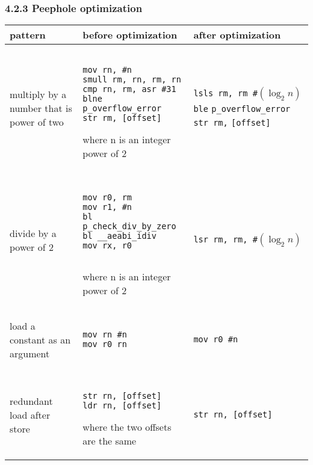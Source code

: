\documentclass[10pt,a4paper]{report}
\newenvironment{tabularverbatim}
 {\VerbatimEnvironment
  \begin{BVerbatim}[baseline=c,formatcom=\setlength{\baselineskip}{\normalbaselineskip}]}
 {\end{BVerbatim}}
\begin{document}
  \subsubsection*{4.2.3 Peephole optimization}
  \begin{center}
    \begin{tabular}{| m{3cm} | m{4cm} | m{4cm} |}
      \hline
      pattern & before optimization & after optimization \\
      \hline
      multiply by a number that is power of two &
      \begin{tabularverbatim}

mov rn, #n
smull rm, rn, rm, rn
cmp rn, rm, asr #31
blne p_overflow_error
str rm, [offset]

      \end{tabularverbatim}
      \newline
      where n is an integer power of 2
      &
      \texttt{lsls rm, rm \#$(\log_2 n)$}
      \newline
      \texttt{ble} \verb|p_overflow_error|
      \newline
      \texttt{str rm,} \verb|[offset]|
      \\
      \hline
      divide by a power of 2 &
      \begin{tabularverbatim}

mov r0, rm
mov r1, #n
bl p_check_div_by_zero
bl __aeabi_idiv
mov rx, r0
 
      \end{tabularverbatim}
      \newline
      where n is an integer power of 2
      &
      \texttt{lsr rm, rm, \#$(\log_2 n)$}
      \\
      \hline
      load a constant as an argument &
      \begin{tabularverbatim}

mov rn #n
mov r0 rn
 
      \end{tabularverbatim}
      &
      \begin{tabularverbatim}
mov r0 #n

      \end{tabularverbatim}
      \\
      \hline
      redundant load after store &
      \begin{tabularverbatim}

str rn, [offset]
ldr rn, [offset]

      \end{tabularverbatim}
      \newline
      where the two offsets are the same
      &
      \begin{tabularverbatim}
str rn, [offset]
      \end{tabularverbatim}
      \\
      \hline
    \end{tabular}
  \end{center}
\end{document}
